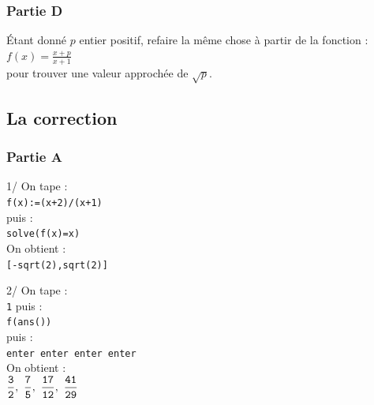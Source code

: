 \documentclass[a4paper,11pt]{book}
\begin{document}
\subsubsection{Partie D}
\'Etant donn\'e $p$ entier positif, refaire la m\^eme chose \`a partir de la 
fonction :\\
$f(x)=\frac{x+p}{x+1}$ \\
pour trouver une valeur approch\'ee de $\sqrt p$.

\subsection{La correction}
\subsubsection{Partie A}
1/ On tape :\\
{\tt f(x):=(x+2)/(x+1)}\\
puis :\\
{\tt solve(f(x)=x)}\\   
On obtient :\\
{\tt [-sqrt(2),sqrt(2)]}

2/  On tape :\\
{\tt 1}
puis :\\
{\tt f(ans())}\\
puis :\\
{\tt enter enter enter enter} \\
On obtient :\\
$\displaystyle {\tt \frac{3}{2}},\ {\tt \frac{7}{5}}, \ {\tt \frac{17}{12}},\ {\tt \frac{41}{29}}$
\end{document}
